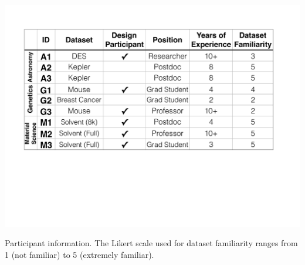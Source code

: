   \begin{table}[h!]
    \centering
    \includegraphics[width=0.9\linewidth]{figures/participant_info.pdf}
    \caption{Participant information. The Likert scale used for dataset familiarity ranges from 1 (not familiar) to 5 (extremely familiar).}
    \label{participants}
    \vspace*{-10pt}
  \end{table}

